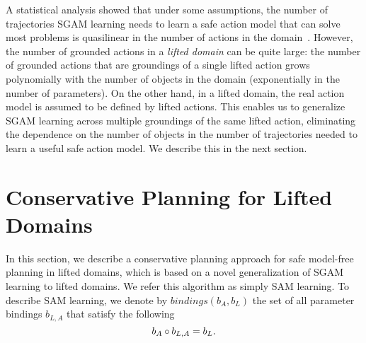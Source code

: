\documentclass{article}
\newcommand{\tuple}[1]{\ensuremath{\left \langle #1 \right \rangle }}
\newcommand{\liftl}{L}
\newcommand{\lifta}{A}
\newcommand{\bindings}{\textit{bindings}}
\begin{document}
A statistical analysis showed that under some assumptions, the number of trajectories SGAM learning needs 
to learn a safe action model that can solve most problems is quasilinear in the number of actions in the domain~\cite{stern2017efficientAndSafe}. 
However, the number of grounded actions in a \emph{lifted domain} can be quite large: the number of grounded actions that are groundings of a single lifted action grows polynomially with the number of objects in the domain (exponentially in the number of parameters). 
On the other hand, in a lifted domain, the real action model is assumed to be defined by lifted actions. 
This enables us to generalize SGAM learning across multiple groundings of the same lifted action, eliminating the dependence on the number of objects in the number of trajectories needed to learn a useful safe action model. We describe this in the next section. 




\section{Conservative Planning for Lifted Domains}






In this section, we describe a conservative planning approach for safe model-free planning in lifted domains, 
which is based on a novel generalization of SGAM learning to lifted domains. We refer this algorithm as simply SAM learning. 
To describe SAM learning, 
we denote by $\bindings(b_\lifta, b_\liftl)$ the set of all 
parameter bindings $b_{\liftl, \lifta}$ that satisfy the following
\begin{equation}
\small
    b_\lifta\circ b_{\liftl,\lifta} = b_\liftl.
    \label{eq:inferbind}
\end{equation}
\end{document}
